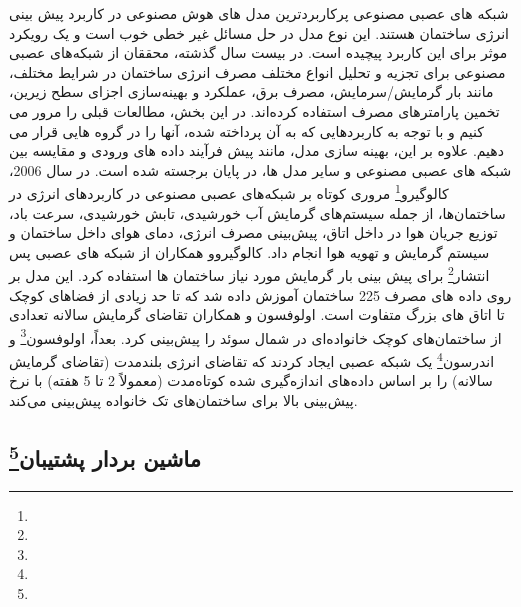 شبکه های عصبی مصنوعی پرکاربردترین مدل های هوش مصنوعی در کاربرد پیش بینی انرژی ساختمان هستند. این نوع مدل در حل مسائل غیر خطی خوب است و یک رویکرد موثر برای این کاربرد پیچیده است. در بیست سال گذشته، محققان از شبکه‌های عصبی مصنوعی برای تجزیه و تحلیل انواع مختلف مصرف انرژی ساختمان در شرایط مختلف، مانند بار گرمایش/سرمایش، مصرف برق، عملکرد و بهینه‌سازی اجزای سطح زیرین، تخمین پارامترهای مصرف استفاده کرده‌اند. در این بخش، مطالعات قبلی را مرور می کنیم و با توجه به کاربردهایی که به آن پرداخته شده، آنها را در گروه هایی قرار می دهیم. علاوه بر این، بهینه سازی مدل، مانند پیش فرآیند داده های ورودی و مقایسه بین شبکه های عصبی مصنوعی و سایر مدل ها، در پایان برجسته شده است. در سال 2006، کالوگیرو\footnote{} \cite{kalogirou1997building} مروری کوتاه بر شبکه‌های عصبی مصنوعی در کاربردهای انرژی در ساختمان‌ها، از جمله سیستم‌های گرمایش آب خورشیدی، تابش خورشیدی، سرعت باد، توزیع جریان هوا در داخل اتاق، پیش‌بینی مصرف انرژی، دمای هوای داخل ساختمان و سیستم گرمایش و تهویه هوا انجام داد.
کالوگیرو\footnotemark[18] و همکاران \cite{kalogirou2006artificial} از شبکه های عصبی پس انتشار\footnote{} برای پیش بینی بار گرمایش مورد نیاز ساختمان ها استفاده کرد. این مدل بر روی داده های مصرف 225 ساختمان آموزش داده شد که تا حد زیادی از فضاهای کوچک تا اتاق های بزرگ متفاوت است. اولوفسون و همکاران \cite{olofsson1998method} تقاضای گرمایش سالانه تعدادی از ساختمان‌های کوچک خانواده‌ای در شمال سوئد را پیش‌بینی کرد. بعداً، اولوفسون\footnote{} و اندرسون\footnote{}\cite{olofsson2001long} یک شبکه عصبی ایجاد کردند که تقاضای انرژی بلندمدت (تقاضای گرمایش سالانه) را بر اساس داده‌های اندازه‌گیری شده کوتاه‌مدت (معمولاً 2 تا 5 هفته) با نرخ پیش‌بینی بالا برای ساختمان‌های تک خانواده پیش‌بینی می‌کند.


\subsection{ماشین بردار پشتیبان\footnote{}}

